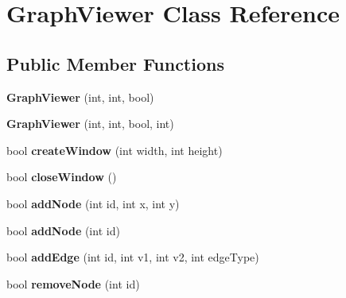 \hypertarget{class_graph_viewer}{\section{Graph\-Viewer Class Reference}
\label{class_graph_viewer}
}
\subsection*{Public Member Functions}
\begin{DoxyCompactItemize}
\item 
\hypertarget{class_graph_viewer_a1298df6c55ca961f9a5ab578a8c0a18c}{{\bfseries Graph\-Viewer} (int, int, bool)}\label{class_graph_viewer_a1298df6c55ca961f9a5ab578a8c0a18c}

\item 
\hypertarget{class_graph_viewer_a33586585f2653fd5ebf5111889c60468}{{\bfseries Graph\-Viewer} (int, int, bool, int)}\label{class_graph_viewer_a33586585f2653fd5ebf5111889c60468}

\item 
\hypertarget{class_graph_viewer_ae5247dc66449dcd21fc5d531bbbaddfa}{bool {\bfseries create\-Window} (int width, int height)}\label{class_graph_viewer_ae5247dc66449dcd21fc5d531bbbaddfa}

\item 
\hypertarget{class_graph_viewer_a85990c1eaac7feed3950960d4bd2fd4c}{bool {\bfseries close\-Window} ()}\label{class_graph_viewer_a85990c1eaac7feed3950960d4bd2fd4c}

\item 
\hypertarget{class_graph_viewer_a5421e86ac76433876309236ba96e70a2}{bool {\bfseries add\-Node} (int id, int x, int y)}\label{class_graph_viewer_a5421e86ac76433876309236ba96e70a2}

\item 
\hypertarget{class_graph_viewer_ab9be856eb5f45284719a3bb119ec01ea}{bool {\bfseries add\-Node} (int id)}\label{class_graph_viewer_ab9be856eb5f45284719a3bb119ec01ea}

\item 
\hypertarget{class_graph_viewer_aad0c1448c37f744209ffb671f1bd0015}{bool {\bfseries add\-Edge} (int id, int v1, int v2, int edge\-Type)}\label{class_graph_viewer_aad0c1448c37f744209ffb671f1bd0015}

\item 
\hypertarget{class_graph_viewer_a0c418639bb911eb827cabf895915f775}{bool {\bfseries remove\-Node} (int id)}\label{class_graph_viewer_a0c418639bb911eb827cabf895915f775}


\end{DoxyCompactItemize}
